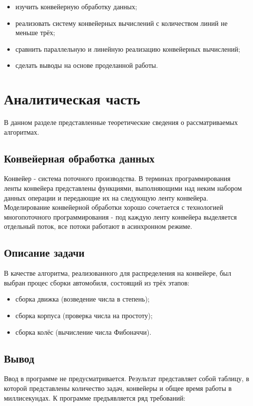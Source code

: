 \documentclass[12pt]{report}
\begin{document}
\begin{itemize}
	\item изучить конвейерную обработку данных;
	\item реализовать систему конвейерных вычислений с количеством линий не меньше трёх;
	\item сравнить параллельную и линейную реализацию конвейерных вычислений;
	\item сделать выводы на основе проделанной работы.
\end{itemize}

\chapter{Аналитическая часть}

В данном разделе представленные теоретические сведения о рассматриваемых алгоритмах.

\section{Конвейерная обработка данных}

Конвейер - система поточного производства. В терминах программирования ленты конвейера представлены функциями, выполняющими над неким набором данных операции и передающие их на следующую ленту конвейера. Моделирование конвейерной обработки хорошо сочетается с технологией многопоточного программирования - под каждую ленту конвейера выделяется отдельный поток, все потоки работают в асинхронном режиме.

\section{Описание задачи}

В качестве алгоритма, реализованного для распределения на конвейере, был выбран процес сборки автомобиля, состоящий из трёх этапов:

\begin{itemize}
	\item сборка движка (возведение числа в степень);
	\item сборка корпуса (проверка числа на простоту);
	\item сборка колёс (вычисление числа Фибоначчи).
\end{itemize}

\section{Вывод}
Ввод в программе не предусматривается. Результат представляет собой таблицу, в которой представлены количество задач, конвейеры и общее время работы в миллисекундах. К программе предъявляется ряд требований:
\end{document}
